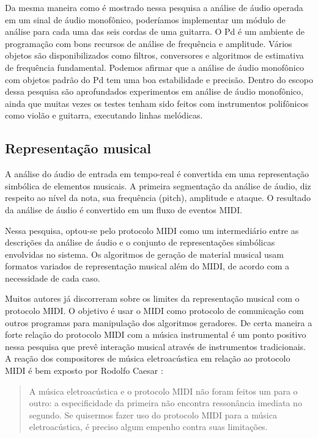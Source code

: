\documentclass{ppgmus}
\begin{document}
Da mesma maneira como é mostrado nessa pesquisa a análise de áudio operada em um sinal de áudio
monofônico, poderíamos implementar um módulo de análise para cada uma das seis cordas de uma guitarra.
O Pd é um ambiente de programação com bons recursos de análise de frequência e amplitude. Vários
objetos são disponibilizados como filtros, conversores e algoritmos de estimativa de frequência fundamental.
Podemos afirmar que a análise de áudio monofônico com objetos padrão do Pd tem uma boa estabilidade e
precisão. Dentro do escopo dessa pesquisa são aprofundados experimentos em análise de áudio monofônico,
ainda que muitas vezes os testes tenham sido feitos com instrumentos polifônicos como violão e 
guitarra, executando linhas melódicas.


 
\subsection{Representação musical}

A análise do áudio de entrada em tempo-real é convertida em uma representação simbólica de 
elementos musicais. A primeira segmentação da análise
de áudio, diz respeito ao nível da nota, sua frequência (pitch),
amplitude e ataque. O resultado da análise de áudio é convertido
em um fluxo de eventos MIDI.

Nessa pesquisa, optou-se pelo protocolo MIDI como um intermediário
entre as descrições da análise de áudio e o conjunto de representações
simbólicas envolvidas no sistema. Os algoritmos de geração
de material musical usam formatos variados de representação musical 
além do MIDI, de acordo com a necessidade de cada caso.

Muitos autores já discorreram sobre os limites da representação musical
com o protocolo MIDI. O objetivo é usar o MIDI como protocolo de comunicação
com outros programas para manipulação dos algoritmos geradores.
De certa maneira a forte relação do protocolo MIDI com a música instrumental
é um ponto positivo nessa pesquisa que prevê interação musical através de 
instrumentos tradicionais. 
A reação dos compositores de música eletroacústica em relação ao protocolo MIDI
é bem exposto por Rodolfo Caesar :

\begin{quote}
A música eletroacústica e o protocolo MIDI não foram feitos um para o outro: a especificidade da 
primeira não encontra ressonância imediata no segundo. Se quisermos fazer uso do protocolo MIDI 
para a música eletroacústica, é preciso algum empenho contra suas limitações. \cite{caesarcopa} 
\end{quote}
\end{document}
